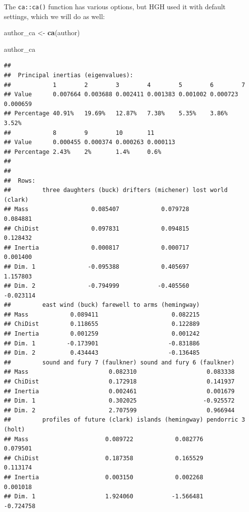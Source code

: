 \documentclass[
]{book}
\newenvironment{Shaded}{\begin{snugshade}}{\end{snugshade}}
\newcommand{\FunctionTok}[1]{\textcolor[rgb]{0.13,0.29,0.53}{\textbf{#1}}}
\newcommand{\NormalTok}[1]{#1}
\newcommand{\OtherTok}[1]{\textcolor[rgb]{0.56,0.35,0.01}{#1}}
\begin{document}
The \texttt{ca::ca()} function has various options, but HGH used it with default settings, which we will do as well:

\begin{Shaded}
\begin{Highlighting}[]
\NormalTok{author\_ca }\OtherTok{\textless{}{-}} \FunctionTok{ca}\NormalTok{(author)}

\NormalTok{author\_ca}
\end{Highlighting}
\end{Shaded}

\begin{verbatim}
## 
##  Principal inertias (eigenvalues):
##            1        2        3        4        5        6        7       
## Value      0.007664 0.003688 0.002411 0.001383 0.001002 0.000723 0.000659
## Percentage 40.91%   19.69%   12.87%   7.38%    5.35%    3.86%    3.52%   
##            8        9        10       11      
## Value      0.000455 0.000374 0.000263 0.000113
## Percentage 2.43%    2%       1.4%     0.6%    
## 
## 
##  Rows:
##         three daughters (buck) drifters (michener) lost world (clark)
## Mass                  0.085407            0.079728           0.084881
## ChiDist               0.097831            0.094815           0.128432
## Inertia               0.000817            0.000717           0.001400
## Dim. 1               -0.095388            0.405697           1.157803
## Dim. 2               -0.794999           -0.405560          -0.023114
##         east wind (buck) farewell to arms (hemingway)
## Mass            0.089411                     0.082215
## ChiDist         0.118655                     0.122889
## Inertia         0.001259                     0.001242
## Dim. 1         -0.173901                    -0.831886
## Dim. 2          0.434443                    -0.136485
##         sound and fury 7 (faulkner) sound and fury 6 (faulkner)
## Mass                       0.082310                    0.083338
## ChiDist                    0.172918                    0.141937
## Inertia                    0.002461                    0.001679
## Dim. 1                     0.302025                   -0.925572
## Dim. 2                     2.707599                    0.966944
##         profiles of future (clark) islands (hemingway) pendorric 3 (holt)
## Mass                      0.089722            0.082776           0.079501
## ChiDist                   0.187358            0.165529           0.113174
## Inertia                   0.003150            0.002268           0.001018
## Dim. 1                    1.924060           -1.566481          -0.724758

\end{verbatim}
\end{document}

